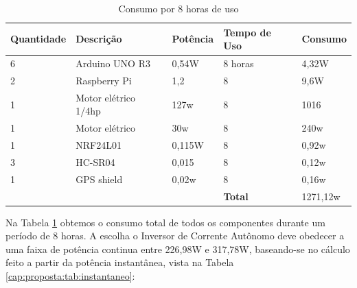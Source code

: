 \begin{table}[h!]
\centering
\caption{Consumo por 8 horas de uso}
\label{cap:proposta:tab:quantificar}
\begin{tabular}{lll|l|l|}
\hline
\multicolumn{1}{|l|}{\textbf{Quantidade}} & \multicolumn{1}{l|}{\textbf{Descrição}}   & \textbf{Potência} & \textbf{Tempo de Uso} & \textbf{Consumo} \\ \hline
\multicolumn{1}{|l|}{6}                   & \multicolumn{1}{l|}{Arduino UNO R3}       & 0,54W             & 8 horas               & 4,32W            \\ \hline
\multicolumn{1}{|l|}{2}                   & \multicolumn{1}{l|}{Raspberry Pi}         & 1,2               & 8                     & 9,6W             \\ \hline
\multicolumn{1}{|l|}{1}                   & \multicolumn{1}{l|}{Motor elétrico 1/4hp} & 127w             & 8                     & 1016         \\ \hline
\multicolumn{1}{|l|}{1}                   & \multicolumn{1}{l|}{Motor elétrico}       & 30w               & 8                     & 240w             \\ \hline
\multicolumn{1}{|l|}{1}                   & \multicolumn{1}{l|}{NRF24L01}             & 0,115W            & 8                     & 0,92w            \\ \hline
\multicolumn{1}{|l|}{3}                   & \multicolumn{1}{l|}{HC-SR04}              & 0,015             & 8                     & 0,12w            \\ \hline
\multicolumn{1}{|l|}{1}                   & \multicolumn{1}{l|}{GPS shield}           & 0,02w             & 8                     & 0,16w            \\ \hline
                                          &                                           &                   & \textbf{Total}        & 1271,12w      \\ \cline{4-5} 
\end{tabular}
\end{table}

Na Tabela \ref{cap:proposta:tab:quantificar} obtemos o consumo total de todos os componentes durante um período de 8 horas. A escolha o Inversor de Corrente Autônomo deve obedecer a uma faixa de potência continua entre 226,98W e 317,78W, baseando-se no cálculo feito a partir da potência instantânea, vista na Tabela \ref{cap:proposta:tab:instantaneo}: 

